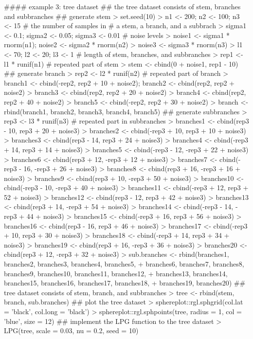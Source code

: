 \begin{example}
  #### example 3: tree dataset
  ## the tree dataset consists of stem, branches and subbranches
  ## generate stem
  > set.seed(10)
  > n1 <- 200; n2 <- 100; n3 <- 15     # the number of samples in
                                       # a stem, a branch, and a subbrach
  > sigma1 <- 0.1; sigma2 <- 0.05; sigma3 <- 0.01          # noise levels
  > noise1 <- sigma1 * rnorm(n1); noise2 <- sigma2 * rnorm(n2)
  > noise3 <- sigma3 * rnorm(n3)
  > l1 <- 70; l2 <- 20; l3 <- 1        # length of stem, branches, and subbranches
  > rep1 <- l1 * runif(n1)             # repeated part of stem
  > stem <- cbind(0 + noise1, rep1 - 10)
  ## generate branch
  > rep2 <- l2 * runif(n2)             # repeated part of branch
  > branch1 <- cbind(-rep2, rep2 + 10 + noise2); branch2 <- cbind(rep2, rep2 + noise2)
  > branch3 <- cbind(rep2, rep2 + 20 + noise2)
  > branch4 <- cbind(rep2, rep2 + 40 + noise2)
  > branch5 <- cbind(-rep2, rep2 + 30 + noise2)
  > branch <- rbind(branch1, branch2, branch3, branch4, branch5)
  ## generate subbranches
  > rep3 <- l3 * runif(n3)             # repeated part in subbranches
  > branches1 <- cbind(rep3 - 10, rep3 + 20 + noise3)
  > branches2 <- cbind(-rep3 + 10, rep3 + 10 + noise3)
  > branches3 <- cbind(rep3 - 14, rep3 + 24 + noise3)
  > branches4 <- cbind(-rep3 + 14, rep3 + 14 + noise3)
  > branches5 <- cbind(-rep3 - 12, -rep3 + 22 + noise3)
  > branches6 <- cbind(rep3 + 12, -rep3 + 12 + noise3)
  > branches7 <- cbind(-rep3 - 16, -rep3 + 26 + noise3)
  > branches8 <- cbind(rep3 + 16, -rep3 + 16 + noise3)
  > branches9 <- cbind(rep3 + 10, -rep3 + 50 + noise3)
  > branches10 <- cbind(-rep3 - 10, -rep3 + 40 + noise3)
  > branches11 <- cbind(-rep3 + 12, rep3 + 52 + noise3)
  > branches12 <- cbind(rep3 - 12, rep3 + 42 + noise3)
  > branches13 <- cbind(rep3 + 14, -rep3 + 54 + noise3)
  > branches14 <- cbind(-rep3 - 14, -rep3 + 44 + noise3)
  > branches15 <- cbind(-rep3 + 16, rep3 + 56 + noise3)
  > branches16 <- cbind(rep3 - 16, rep3 + 46 + noise3)
  > branches17 <- cbind(-rep3 + 10, rep3 + 30 + noise3)
  > branches18 <- cbind(-rep3 + 14, rep3 + 34 + noise3)
  > branches19 <- cbind(rep3 + 16, -rep3 + 36 + noise3)
  > branches20 <- cbind(rep3 + 12, -rep3 + 32 + noise3)
  > sub.branches <- rbind(branches1, branches2, branches3, branches4, branches5,
  + branches6, branches7, branches8, branches9, branches10, branches11, branches12,
  + branches13, branches14, branches15, branches16, branches17, branches18,
  + branches19, branches20)
  ## tree dataset consists of stem, branch, and subbranches
  > tree <- rbind(stem, branch, sub.branches)
  ## plot the tree dataset
  > sphereplot::rgl.sphgrid(col.lat = 'black', col.long = 'black')
  > sphereplot::rgl.sphpoints(tree, radius = 1, col = 'blue', size = 12)
  ## implement the LPG function to the tree dataset
  > LPG(tree, scale = 0.03, nu = 0.2, seed = 10)
\end{example}


